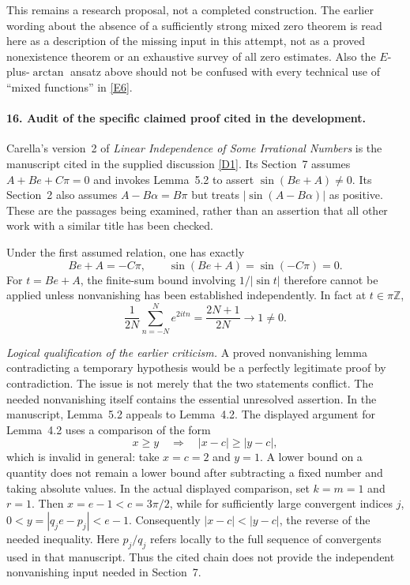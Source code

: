 \documentclass[11pt]{article}
\newcommand{\Z}{\mathbb Z}
\begin{document}
This remains a research proposal, not a completed construction. The earlier
wording about the absence of a sufficiently strong mixed zero theorem is
read here as a description of the missing input in this attempt, not as a
proved nonexistence theorem or an exhaustive survey of all zero estimates.
Also the $E$-plus-$\arctan$ ansatz above should not be confused with every
technical use of ``mixed functions'' in \href{https://arxiv.org/html/2301.13518v1}{[E6]}.

\paragraph{16. Audit of the specific claimed proof cited in the development.}
Carella's version~2 of \emph{Linear Independence of Some Irrational
Numbers} is the manuscript cited in the supplied discussion
\href{https://arxiv.org/html/2007.15000v2}{[D1]}.
Its Section~7 assumes $A+Be+C\pi=0$ and invokes Lemma~5.2 to assert
$\sin(Be+A)\ne0$. Its Section~2 also assumes
$A-B\alpha=B\pi$ but treats $|\sin(A-B\alpha)|$ as positive.
These are the passages being examined, rather than an assertion that all
other work with a similar title has been checked.

Under the first assumed relation, one has exactly
\[
 Be+A=-C\pi,\qquad \sin(Be+A)=\sin(-C\pi)=0.
\]
For $t=Be+A$, the finite-sum bound involving $1/|\sin t|$ therefore cannot
be applied unless nonvanishing has been established independently. In
fact at $t\in\pi\Z$,
\[
 \frac1{2N}\sum_{n=-N}^{N}e^{2itn}
 =\frac{2N+1}{2N}\longrightarrow1\ne0.
\]

\textit{Logical qualification of the earlier criticism.}
A proved nonvanishing lemma contradicting a temporary hypothesis would be
a perfectly legitimate proof by contradiction. The issue is not merely
that the two statements conflict. The needed nonvanishing itself contains
the essential unresolved assertion. In the manuscript, Lemma~5.2 appeals
to Lemma~4.2. The displayed argument for Lemma~4.2 uses a comparison of the
form
\[
 x\ge y\quad\Longrightarrow\quad |x-c|\ge|y-c|,
\]
which is invalid in general: take $x=c=2$ and $y=1$. A lower bound on a
quantity does not remain a lower bound after subtracting a fixed number
and taking absolute values. In the actual displayed comparison, set
$k=m=1$ and $r=1$. Then $x=e-1<c=3\pi/2$, while for sufficiently large
convergent indices $j$,
$0<y=|q_je-p_j|<e-1$. Consequently $|x-c|<|y-c|$, the reverse of the
needed inequality. Here $p_j/q_j$ refers locally to the full sequence of
convergents used in that manuscript. Thus the cited chain does not provide
the independent nonvanishing input needed in Section~7.
\end{document}
